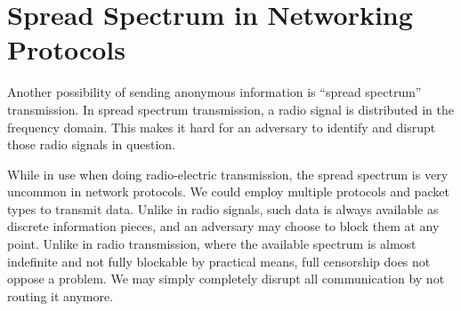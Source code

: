 \section{Spread Spectrum in Networking Protocols}
Another possibility of sending anonymous information is ``spread spectrum'' transmission. In spread spectrum transmission, a radio signal is distributed in the frequency domain. This makes it hard for an adversary to identify and disrupt those radio signals in question. 

While in use when doing radio-electric transmission, the spread spectrum is very uncommon in network protocols. We could employ multiple protocols and packet types to transmit data. Unlike in radio signals, such data is always available as discrete information pieces, and an adversary may choose to block them at any point. Unlike in radio transmission, where the available spectrum is almost indefinite and not fully blockable by practical means, full censorship does not oppose a problem. We may simply completely disrupt all communication by not routing it anymore.
